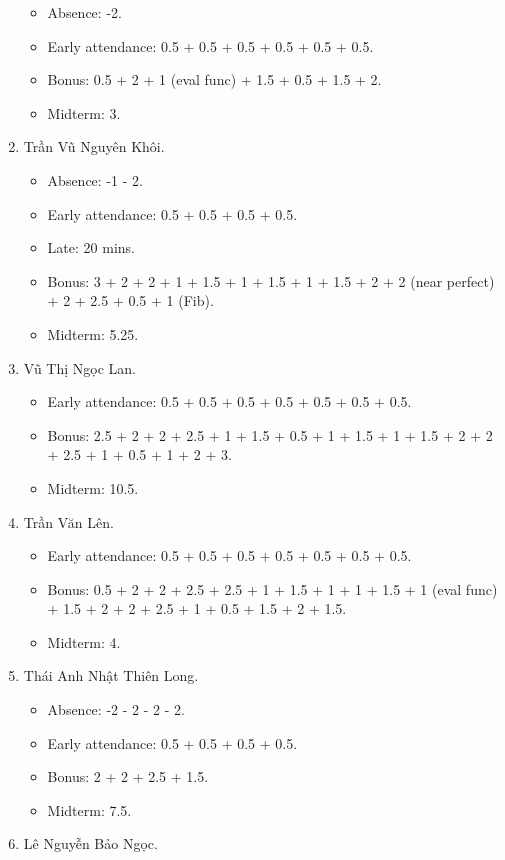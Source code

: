 \documentclass{article}
\begin{document}
\begin{enumerate}
\begin{itemize}
		\item Absence: -2.
		\item Early attendance: 0.5 + 0.5 + 0.5 + 0.5 + 0.5 + 0.5.
		\item Bonus: 0.5 + 2 + 1 (eval func) + 1.5 + 0.5 + 1.5 + 2.
        \item Midterm: 3.
	\end{itemize}
	\item {\sc Trần Vũ Nguyên Khôi.}
	\begin{itemize}
        \item Absence: -1 - 2.
		\item Early attendance: 0.5 + 0.5 + 0.5 + 0.5.
		\item Late: 20 mins.
		\item Bonus: 3 + 2 + 2 + 1 + 1.5 + 1 + 1.5 + 1 + 1.5 + 2 + 2 (near perfect) + 2 + 2.5 + 0.5 + 1 (Fib).
        \item Midterm: 5.25.
	\end{itemize}
	\item {\sc Vũ Thị Ngọc Lan.}
	\begin{itemize}
		\item Early attendance: 0.5 + 0.5 + 0.5 + 0.5 + 0.5 + 0.5 + 0.5.
		\item Bonus: 2.5 + 2 + 2 + 2.5 + 1 + 1.5 + 0.5 + 1 + 1.5 + 1 + 1.5 + 2 + 2 + 2.5 + 1 + 0.5 + 1 + 2 + 3.
        \item Midterm: 10.5.
	\end{itemize}
	\item {\sc Trần Văn Lên.}
	\begin{itemize}
		\item Early attendance: 0.5 + 0.5 + 0.5 + 0.5 + 0.5 + 0.5 + 0.5.
		\item Bonus: 0.5 + 2 + 2 + 2.5 + 2.5 + 1 + 1.5 + 1 + 1 + 1.5 + 1 (eval func) + 1.5 + 2 + 2 + 2.5 + 1 + 0.5 + 1.5 + 2 + 1.5.
        \item Midterm: 4.
	\end{itemize}
	\item {\sc Thái Anh Nhật Thiên Long.}
	\begin{itemize}
		\item Absence: -2 - 2 - 2 - 2.
		\item Early attendance: 0.5 + 0.5 + 0.5 + 0.5.
		\item Bonus: 2 + 2 + 2.5 + 1.5.
        \item Midterm: 7.5.
	\end{itemize}
	\item {\sc Lê Nguyễn Bảo Ngọc.}
	\begin{itemize}

\end{itemize}
\end{enumerate}
\end{document}
